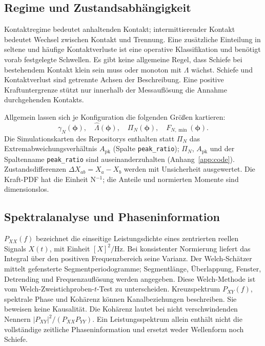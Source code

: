 \documentclass[11pt,a4paper]{article}
\begin{document}
\subsection{Regime und Zustandsabhängigkeit}
Kontaktregime bedeutet anhaltenden Kontakt; intermittierender Kontakt bedeutet Wechsel zwischen Kontakt und Trennung. Eine zusätzliche Einteilung in seltene und häufige Kontaktverluste ist eine operative Klassifikation und benötigt vorab festgelegte Schwellen.
Es gibt keine allgemeine Regel, dass Schiefe bei bestehendem Kontakt klein sein muss oder monoton mit $\Lambda$ wächst. Schiefe und Kontaktverlust sind getrennte Achsen der Beschreibung. Eine positive Kraftuntergrenze stützt nur innerhalb der Messauflösung die Annahme durchgehenden Kontakts.

Allgemein lassen sich je Konfiguration die folgenden Größen kartieren:
\[\gamma_N(\boldsymbol\phi),\quad\hat\Lambda(\boldsymbol\phi),\quad\Pi_N(\boldsymbol\phi),\quad F_{N,\min}(\boldsymbol\phi).\] Die Simulationskarten des Repositorys enthalten statt $\Pi_N$ das Extremabweichungsverhältnis $A_{\mathrm{pk}}$ (Spalte \texttt{peak\_ratio}); $\Pi_N$, $A_{\mathrm{pk}}$ und der Spaltenname \texttt{peak\_ratio} sind auseinanderzuhalten (Anhang~\ref{app:code}). Zustandsdifferenzen $\Delta X_{ab}=X_a-X_b$ werden mit Unsicherheit ausgewertet. Die Kraft-PDF hat die Einheit N$^{-1}$; die Anteile und normierten Momente sind dimensionslos.


\subsection{Spektralanalyse und Phaseninformation}
$P_{XX}(f)$ bezeichnet die einseitige Leistungsdichte eines zentrierten reellen Signals $X(t)$, mit Einheit $[X]^2/\mathrm{Hz}$. Bei konsistenter Normierung liefert das Integral über den positiven Frequenzbereich seine Varianz. Der Welch-Schätzer mittelt gefensterte Segmentperiodogramme; Segmentlänge, Überlappung, Fenster, Detrending und Frequenzauflösung werden angegeben. Diese Welch-Methode ist vom Welch-Zweistichproben-$t$-Test zu unterscheiden.
Kreuzspektrum $P_{XY}(f)$, spektrale Phase und Kohärenz können Kanalbeziehungen beschreiben. Sie beweisen keine Kausalität. Die Kohärenz lautet bei nicht verschwindenden Nennern $|P_{XY}|^2/(P_{XX}P_{YY})$. Ein Leistungsspektrum allein enthält nicht die vollständige zeitliche Phaseninformation und ersetzt weder Wellenform noch Schiefe.
\end{document}
